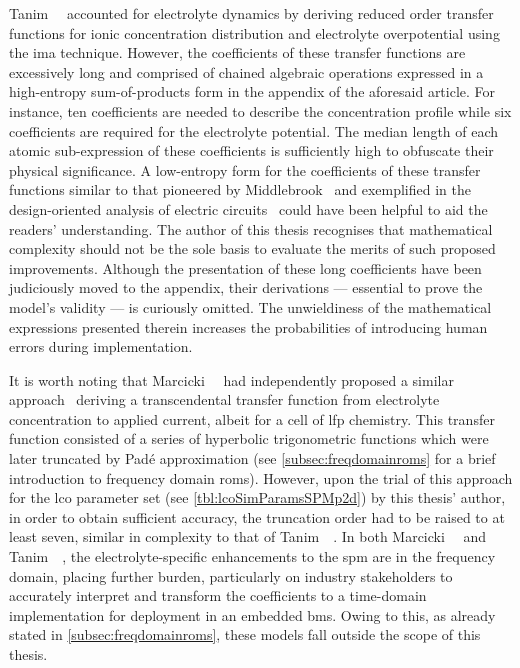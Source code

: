 Tanim~\etal~\cite{Tanim2014}  accounted  for  electrolyte dynamics  by  deriving
reduced  order  transfer  functions  for ionic  concentration  distribution  and
electrolyte   overpotential  using   the  \gls{ima}   technique.  However,   the
coefficients  of these  transfer functions  are excessively  long and  comprised
of  chained algebraic  operations  expressed in  a high-entropy  sum-of-products
form   in  the   appendix  of   the   aforesaid  article.   For  instance,   ten
coefficients  are  needed  to  describe  the  concentration  profile  while  six
coefficients  are required  for  the electrolyte  potential.  The median  length
of  each  atomic  sub-expression  of these  coefficients  is  sufficiently  high
to  obfuscate   their  physical  significance.   A  low-entropy  form   for  the
coefficients  of  these   transfer  functions  similar  to   that  pioneered  by
Middlebrook~\cite{Middlebrook} and  exemplified in the  design-oriented analysis
of  electric   circuits~\cite{Middlebrook1998,Vorperian2002}  could   have  been
helpful to aid the readers' understanding.  The author of this thesis recognises
that  mathematical complexity  should  not be  the sole  basis  to evaluate  the
merits of  such proposed improvements.  Although the presentation of  these long
coefficients  have been  judiciously moved  to the  appendix, their  derivations
---  essential to  prove  the model's  validity ---  is  curiously omitted.  The
unwieldiness  of the  mathematical expressions  presented therein  increases the
probabilities of introducing human errors during implementation.

It  is worth  noting that  Marcicki~\etal~\cite{Marcicki2013} had  independently
proposed  a similar  approach \viz~deriving  a transcendental  transfer function
from  electrolyte  concentration  to  applied  current, albeit  for  a  cell  of
\gls{lfp} chemistry. This transfer function  consisted of a series of hyperbolic
trigonometric functions which  were later truncated by  Padé approximation (see
\cref{subsec:freqdomainroms}  for  a  brief  introduction  to  frequency  domain
\glspl{rom}).  However,  upon the  trial  of  this  approach for  the  \gls{lco}
parameter  set (see  \cref{tbl:lcoSimParamsSPMp2d}) by  this thesis'  author, in
order to obtain sufficient accuracy, the truncation order had to be raised to at
least seven, similar in complexity  to that of Tanim~\etal~\cite{Tanim2014a}. In
both  Marcicki~\etal~\cite{Marcicki2013} and  Tanim~\etal~\cite{Tanim2014a}, the
electrolyte-specific enhancements to the \gls{spm}  are in the frequency domain,
placing  further burden,  particularly  on industry  stakeholders to  accurately
interpret and  transform the  coefficients to  a time-domain  implementation for
deployment  in an  embedded  \gls{bms}.  Owing to  this,  as  already stated  in
\cref{subsec:freqdomainroms},  these  models  fall  outside the  scope  of  this
thesis.

